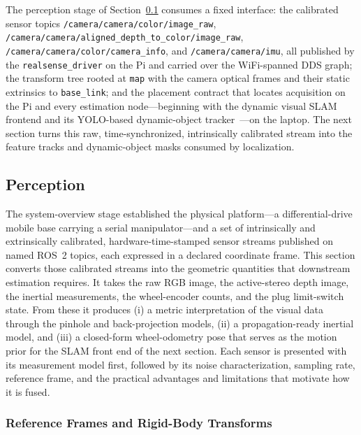 The perception stage of Section~\ref{meth:sec:perception} consumes a fixed interface: the calibrated sensor topics \texttt{/\allowbreak{}camera/\allowbreak{}camera/\allowbreak{}color/\allowbreak{}image\_\allowbreak{}raw}, \texttt{/\allowbreak{}camera/\allowbreak{}camera/\allowbreak{}aligned\_\allowbreak{}depth\_\allowbreak{}to\_\allowbreak{}color/\allowbreak{}image\_\allowbreak{}raw}, \texttt{/\allowbreak{}camera/\allowbreak{}camera/\allowbreak{}color/\allowbreak{}camera\_\allowbreak{}info}, and \texttt{/camera/camera/imu}, all published by the \texttt{realsense\_driver} on the Pi and carried over the WiFi-spanned DDS graph; the transform tree rooted at \texttt{map} with the camera optical frames and their static extrinsics to \texttt{base\_link}; and the placement contract that locates acquisition on the Pi and every estimation node---beginning with the dynamic visual SLAM frontend and its YOLO-based dynamic-object tracker~\cite{redmon2016yolo}---on the laptop. The next section turns this raw, time-synchronized, intrinsically calibrated stream into the feature tracks and dynamic-object masks consumed by localization.


\subsection{Perception}\label{meth:sec:perception}

The system-overview stage established the physical platform---a differential-drive mobile base carrying a serial manipulator---and a set of intrinsically and extrinsically calibrated, hardware-time-stamped sensor streams published on named ROS~2 topics, each expressed in a declared coordinate frame. This section converts those calibrated streams into the geometric quantities that downstream estimation requires. It takes the raw RGB image, the active-stereo depth image, the inertial measurements, the wheel-encoder counts, and the plug limit-switch state. From these it produces (i) a metric interpretation of the visual data through the pinhole and back-projection models, (ii) a propagation-ready inertial model, and (iii) a closed-form wheel-odometry pose that serves as the motion prior for the SLAM front end of the next section. Each sensor is presented with its measurement model first, followed by its noise characterization, sampling rate, reference frame, and the practical advantages and limitations that motivate how it is fused.

\subsubsection{Reference Frames and Rigid-Body Transforms}

